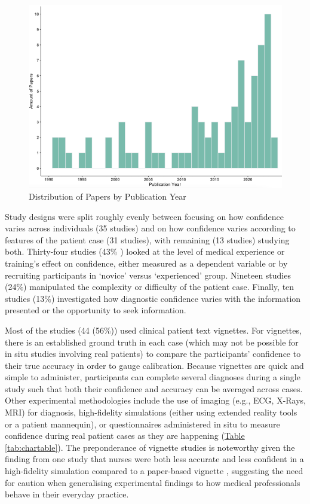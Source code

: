 \documentclass[a4paper, nobind]{templates/ociamthesis}
\begin{document}
\begin{figure}[H]

{\centering \includegraphics[width=1\linewidth]{./assets/ReviewYears} 

}

\caption{Distribution of Papers by Publication Year}\label{fig:reviewyears}
\end{figure}

\hfill\break
Study designs were split roughly evenly between focusing on how confidence varies across individuals (35 studies) and on how confidence varies according to features of the patient case (31 studies), with remaining (13 studies) studying both. Thirty-four studies (43\% ) looked at the level of medical experience or training's effect on confidence, either measured as a dependent variable or by recruiting participants in `novice' versus `experienced' group. Nineteen studies (24\%) manipulated the complexity or difficulty of the patient case. Finally, ten studies (13\%) investigated how diagnostic confidence varies with the information presented or the opportunity to seek information.

\hfill\break
Most of the studies (44 (56\%)) used clinical patient text vignettes. For vignettes, there is an established ground truth in each case (which may not be possible for in situ studies involving real patients) to compare the participants' confidence to their true accuracy in order to gauge calibration. Because vignettes are quick and simple to administer, participants can complete several diagnoses during a single study such that both their confidence and accuracy can be averaged across cases. Other experimental methodologies include the use of imaging (e.g., ECG, X-Rays, MRI) for diagnosis, high-fidelity simulations (either using extended reality tools or a patient mannequin), or questionnaires administered in situ to measure confidence during real patient cases as they are happening (\hyperref[tab:chartable]{Table \ref{tab:chartable}}). The preponderance of vignette studies is noteworthy given the finding from one study that nurses were both less accurate and less confident in a high-fidelity simulation compared to a paper-based vignette \autocite{yang_effect_2012}, suggesting the need for caution when generalising experimental findings to how medical professionals behave in their everyday practice.
\end{document}
